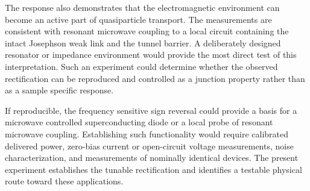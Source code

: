         The response also demonstrates that the electromagnetic environment can become an active part of quasiparticle transport. The measurements are consistent with resonant microwave coupling to a local circuit containing the intact Josephson weak link and the tunnel barrier. A deliberately designed resonator or impedance environment would provide the most direct test of this interpretation. Such an experiment could determine whether the observed rectification can be reproduced and controlled as a junction property rather than as a sample specific response.

        If reproducible, the frequency sensitive sign reversal could provide a basis for a microwave controlled superconducting diode or a local probe of resonant microwave coupling. Establishing such functionality would require calibrated delivered power, zero-bias current or open-circuit voltage measurements, noise characterization, and measurements of nominally identical devices. The present experiment establishes the tunable rectification and identifies a testable physical route toward these applications.
